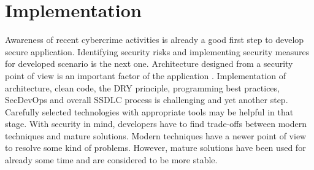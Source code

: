 \documentclass{article} %
\begin{document}
\section {Implementation}
\normalsize Awareness of recent cybercrime activities is already a good first step to develop secure application. Identifying security risks and implementing security measures for developed scenario is the next one. Architecture designed from a security point of view is an important factor of the application \cite{bib:secure_architecture}. Implementation of architecture, clean code, the DRY principle, programming best practices, SecDevOps and overall SSDLC process is challenging and yet another step. Carefully selected technologies with appropriate tools may be helpful in that stage. With security in mind, developers have to find trade-offs between modern techniques and mature solutions. Modern techniques have a newer point of view to resolve some kind of problems. However, mature solutions have been used for already some time and are considered to be more stable.
\end{document}
